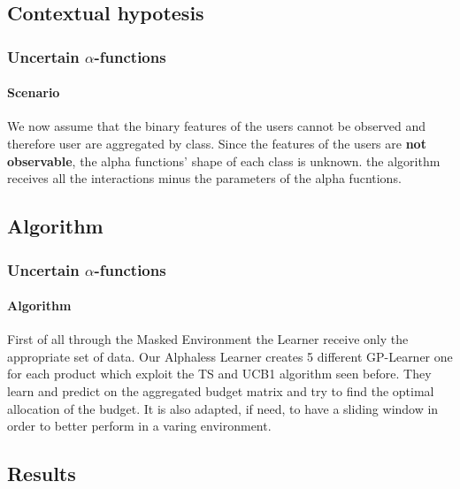 \documentclass[11pt]{beamer}
\begin{document}

\subsection{Contextual hypotesis}


\begin{frame}

\frametitle{Uncertain $\alpha$-functions}
\framesubtitle{Scenario}

We now assume that the binary features of the users cannot be observed and therefore user are aggregated by class.
Since the features of the users are \textbf{not observable}, the alpha functions' shape of each class is unknown. 
the algorithm receives all the interactions minus the parameters of the alpha fucntions.

\end{frame}


\subsection{Algorithm}


\begin{frame}

\frametitle{Uncertain $\alpha$-functions}
\framesubtitle{Algorithm}

First of all through the Masked Environment the Learner receive only the appropriate set of data.
Our Alphaless Learner creates 5 different GP-Learner one for each product which exploit the TS and UCB1 algorithm seen before.
They learn and predict on the aggregated budget matrix and try to find the optimal allocation of the budget.
It is also adapted, if need, to have a sliding window in order to better perform in a varing environment.

\end{frame}


\subsection{Results}
\end{document}
